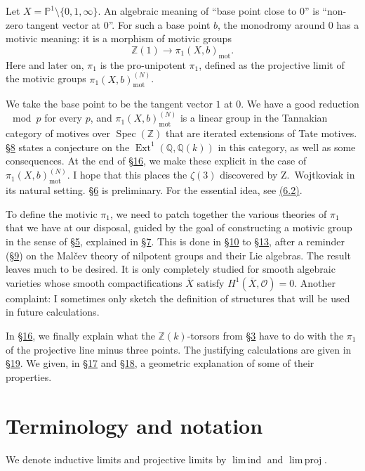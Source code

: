 \documentclass{article}
\theoremstyle{definition}
\newenvironment{env}[1]
  {\renewcommand\theinnerenv{(#1)}\innerenv}
  {\endinnerenv}
\newcommand{\mot}{\mathrm{mot}}
\newcommand{\scr}[1]{{\mathscr{#1}}}
\newcommand{\bb}{\mathbb}
\newcommand{\PP}{\bb{P}}
\newcommand{\ZZ}{\bb{Z}}
\newcommand{\QQ}{\bb{Q}}
\DeclareMathOperator{\Ext}{Ext}
\DeclareMathOperator{\Spec}{Spec}
\DeclareMathOperator{\limind}{lim\,ind}
\DeclareMathOperator{\limproj}{lim\,proj}
\newcommand{\oldpage}[1]{\marginpar{\footnotesize$\Big\vert$ \textit{p.~#1}}}
\begin{document}
Let $X=\PP^1\setminus\{0,1,\infty\}$.
An algebraic meaning of ``base point close to $0$'' is ``non-zero tangent vector at $0$''.
For such a base point $b$, the monodromy around $0$ has a motivic meaning: it is a morphism of motivic groups
\[
  \ZZ(1) \to \pi_1(X,b)_\mot.
\]
Here and later on, $\pi_1$ is the pro-unipotent $\pi_1$, defined as the projective limit of the motivic groups $\pi_1(X,b)_\mot^{(N)}$.

We take the base point to be the tangent vector $1$ at $0$.
We have a good reduction $\mod p$ for every $p$, and $\pi_1(X,b)_\mot^{(N)}$ is a linear group in the Tannakian category of motives over $\Spec(\ZZ)$ that are iterated extensions of Tate motives.
\hyperref[8]{\S8} states a conjecture on the $\Ext^1(\QQ,\QQ(k))$ in this category, as well as some consequences.
At the end of \hyperref[16]{\S16}, we make these explicit in the case of $\pi_1(X,b)_\mot^{(N)}$.
I hope that this places the $\zeta(3)$ discovered by Z.~Wojtkoviak in its natural setting.
\hyperref[6]{\S6} is preliminary.
For the essential idea, see \hyperref[6.2]{(6.2)}.

To define the motivic $\pi_1$, we need to patch together the various theories of $\pi_1$ that we have at our disposal, guided by the goal of constructing a motivic group in the sense of \hyperref[5]{\S5}, explained in \hyperref[7]{\S7}.
This is done in \hyperref[10]{\S10} to \hyperref[13]{\S13}, after a reminder (\hyperref[9]{\S9}) on the Mal\v{c}ev theory of nilpotent groups and their Lie algebras.
The result leaves much to be desired.
It is only completely studied for smooth algebraic varieties whose smooth compactifications $\overline{X}$ satisfy $H^1(\overline{X},\scr{O})=0$.
Another complaint: I sometimes only sketch the definition of structures that will be used in future calculations.

In \hyperref[16]{\S16}, we finally explain what the $\ZZ(k)$-torsors from \hyperref[3]{\S3} have to do with the $\pi_1$ of the projective line minus three points.
The justifying calculations are given in \hyperref[19]{\S19}.
We given, in \hyperref[17]{\S17} and \hyperref[18]{\S18}, a geometric explanation of some of their properties.



\section{Terminology and notation}
\label{0}
\oldpage{9~(87)}

\begin{env}{0.1}
\label{0.1}
  We denote inductive limits and projective limits by $\limind$ and $\limproj$.
\end{env}
\end{document}
